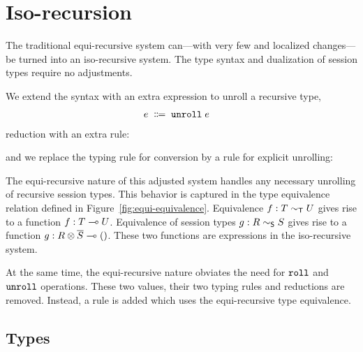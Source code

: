 \section{Iso-recursion}
\label{sec:iso-recursion}

The traditional equi-recursive system can---with very few and localized changes---be turned
into an iso-recursive system. The type syntax and dualization of
session types require no adjustments.

We extend the syntax with an extra expression to unroll a recursive
type,
\begin{align*}
    e \grmdef&
               \EUnroll e
\end{align*}
%
reduction with an extra rule:
%
\begin{mathpar}
\end{mathpar}
%
and we replace the typing rule for conversion by a rule for explicit unrolling:
\begin{mathpar}
\end{mathpar}

The equi-recursive nature of this adjusted system handles any necessary
unrolling of recursive session types. This behavior is captured in the type
equivalence relation defined in Figure~\ref{fig:equi-equivalence}. Equivalence
$f : T \eqt U$ gives rise to a function $f : \TFun {T} {U}$.
Equivalence of session types $g : R \eqs S$ gives rise
to a function $g : \TFun {\TPair {R} {\TDual{S}}} \TUnit$.
These two functions are expressions in the iso-recursive system.

At the same time, the equi-recursive nature obviates the need for $\EkwRoll$
and $\EkwUnroll$ operations. These two values, their two typing rules and
reductions are removed. Instead, a rule is added which uses the equi-recursive
type equivalence.

\subsection{Types}


% 

